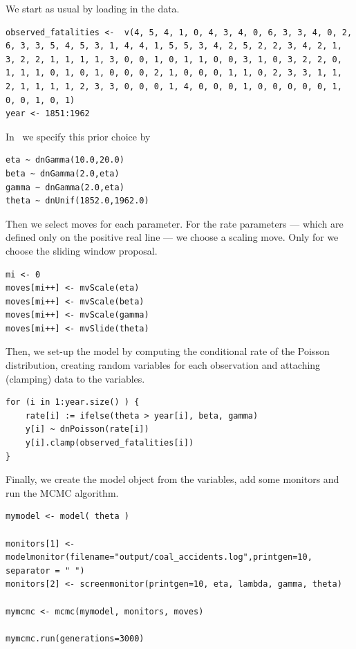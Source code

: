 We start as usual by loading in the data.
{\tt \begin{snugshade*}
\begin{lstlisting} 
observed_fatalities <-  v(4, 5, 4, 1, 0, 4, 3, 4, 0, 6, 3, 3, 4, 0, 2, 6, 3, 3, 5, 4, 5, 3, 1, 4, 4, 1, 5, 5, 3, 4, 2, 5, 2, 2, 3, 4, 2, 1, 3, 2, 2, 1, 1, 1, 1, 3, 0, 0, 1, 0, 1, 1, 0, 0, 3, 1, 0, 3, 2, 2, 0, 1, 1, 1, 0, 1, 0, 1, 0, 0, 0, 2, 1, 0, 0, 0, 1, 1, 0, 2, 3, 3, 1, 1, 2, 1, 1, 1, 1, 2, 3, 3, 0, 0, 0, 1, 4, 0, 0, 0, 1, 0, 0, 0, 0, 0, 1, 0, 0, 1, 0, 1)
year <- 1851:1962
\end{lstlisting}
\end{snugshade*}}
In \Rev~we specify this prior choice by
{\tt \begin{snugshade*}
\begin{lstlisting} 
eta ~ dnGamma(10.0,20.0)
beta ~ dnGamma(2.0,eta)
gamma ~ dnGamma(2.0,eta)
theta ~ dnUnif(1852.0,1962.0)
\end{lstlisting}
\end{snugshade*}}
Then we select moves for each parameter.
For the rate parameters --- which are defined only on the positive real line --- we choose a scaling move.
Only for  we choose the sliding window proposal.
{\tt \begin{snugshade*}
\begin{lstlisting} 
mi <- 0
moves[mi++] <- mvScale(eta)
moves[mi++] <- mvScale(beta)
moves[mi++] <- mvScale(gamma)
moves[mi++] <- mvSlide(theta)
\end{lstlisting}
\end{snugshade*}}
Then, we set-up the model by computing the conditional rate of the Poisson distribution, creating random variables for each observation and attaching (clamping) data to the variables.
{\tt \begin{snugshade*}
\begin{lstlisting} 
for (i in 1:year.size() ) {
    rate[i] := ifelse(theta > year[i], beta, gamma)
    y[i] ~ dnPoisson(rate[i])
    y[i].clamp(observed_fatalities[i])
}
\end{lstlisting}
\end{snugshade*}}
Finally, we create the model object from the variables, add some monitors and run the MCMC algorithm.
{\tt \begin{snugshade*}
\begin{lstlisting} 
mymodel <- model( theta )

monitors[1] <- modelmonitor(filename="output/coal_accidents.log",printgen=10, separator = "	")
monitors[2] <- screenmonitor(printgen=10, eta, lambda, gamma, theta)

mymcmc <- mcmc(mymodel, monitors, moves)

mymcmc.run(generations=3000)
\end{lstlisting}
\end{snugshade*}}




